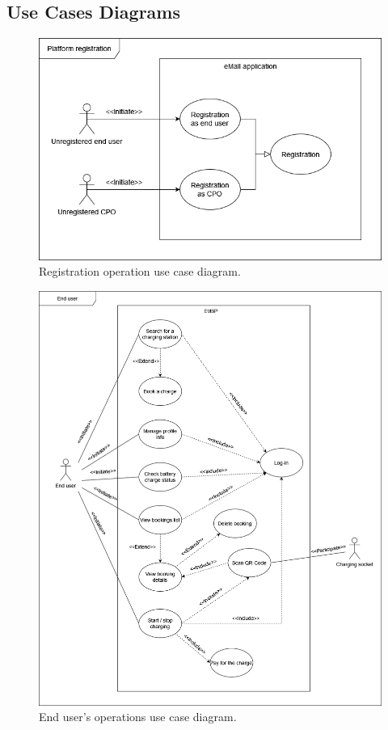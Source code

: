 \subsection{Use Cases Diagrams}
\begin{figure}[H]
    \centering
    \includegraphics[width=\textwidth]{images/uc_registration.png}
    \caption{Registration operation use case diagram.}
    \label{fig:uc_registration}
\end{figure}
\begin{figure}[H]
    \centering
    \includegraphics[width=\textwidth]{images/uc_user.png}
    \caption{End user's operations use case diagram.}
    \label{fig:uc_user}
\end{figure}
